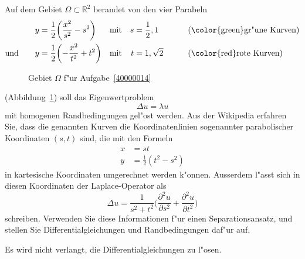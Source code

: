 Auf dem Gebiet $\Omega\subset\mathbb R^2$ berandet von den vier Parabeln
\[
\begin{aligned}
y&=\frac12\biggl( \frac{x^2}{s^2}-s^2\biggr)&&\text{mit}&s&=\frac12,1
	&&\qquad\text{({\color{green}gr"une} Kurven)}\\
\text{und}\qquad
y&=\frac12\biggl(-\frac{x^2}{t^2}+t^2\biggr)&&\text{mit}&t&=1,\sqrt{2}
	&&\qquad\text{({\color{red}rote} Kurven)}
\end{aligned}
\]
\begin{figure}
\centering
{}
\caption{Gebiet $\Omega$ f"ur Aufgabe~\ref{40000014}
\label{40000014:domain}}
\end{figure}
(Abbildung~\ref{40000014:domain})
soll das Eigenwertproblem
\begin{equation}
\Delta u = \lambda u
\label{40000014:dgl}
\end{equation}
mit homogenen Randbedingungen gel"ost werden.
Aus der Wikipedia erfahren Sie, dass die genannten Kurven 
die Koordinatenlinien sogenannter parabolischer Koordinaten $(s,t)$ sind,
die mit den Formeln
\begin{align*}
x&=st\\
y&=\frac12(t^2-s^2)
\end{align*}
in kartesische Koordinaten umgerechnet werden k"onnen.
Ausserdem l"asst sich in diesen Koordinaten der Laplace-Operator als
\[
\Delta u = \frac1{s^2 + t^2}\biggl(\frac{\partial^2 u}{\partial s^2}+\frac{\partial^2u}{\partial t^2}\biggr)
\]
schreiben.
Verwenden Sie diese Informationen f"ur einen Separationsansatz, und
stellen Sie Differentialgleichungen und Randbedingungen daf"ur auf.

\begin{hinweis}
Es wird nicht verlangt, die Differentialgleichungen zu l"osen.
\end{hinweis}

